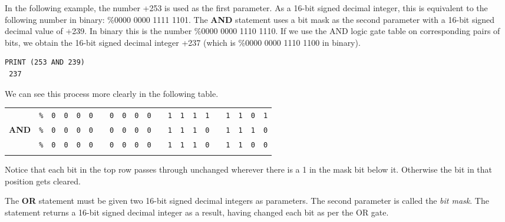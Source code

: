 In the following example, the number +253 is used as the first parameter. As a 16-bit signed decimal integer, this is equivalent to the following number in binary: \%0000 0000 1111 1101. The {\bf AND} statement uses a bit mask as the second parameter with a 16-bit signed decimal value of +239. In binary this is the number \%0000 0000 1110 1110. If we use the AND logic gate table on corresponding pairs of bits, we obtain the 16-bit signed decimal integer +237 (which is \%0000 0000 1110 1100 in binary).
\begin{tcolorbox}[colback=black,coltext=white]
\verbatimfont{\codefont}
\begin{verbatim}
PRINT (253 AND 239)
 237
\end{verbatim}
\end{tcolorbox}

We can see this process more clearly in the following table.

\begin{center}
	\begin{tabular}{ccccccccccccccccccccc}
	  & \texttt{\%} & \texttt{0} & \texttt{0} & \texttt{0} & \texttt{0} & & \texttt{0} & \texttt{0} & \texttt{0} & \texttt{0} & & \texttt{1} & \texttt{1} & \texttt{1} & \texttt{1} & & \texttt{1} & \texttt{1} & \texttt{0} & \texttt{1} \\
	  {\bf AND} & \texttt{\%} & \texttt{0} & \texttt{0} & \texttt{0} & \texttt{0} & & \texttt{0} & \texttt{0} & \texttt{0} & \texttt{0} & & \texttt{1} & \texttt{1} & \texttt{1} & \texttt{0} & & \texttt{1} & \texttt{1} & \texttt{1} & \texttt{0} \\ \hline
	  & \texttt{\%} & \texttt{0} & \texttt{0} & \texttt{0} & \texttt{0} & & \texttt{0} & \texttt{0} & \texttt{0} & \texttt{0} &  & \texttt{1} & \texttt{1} & \texttt{1} & \texttt{0} & & \texttt{1} & \texttt{1} & \texttt{0} & \texttt{0} \\ \hhline{=====================}
	  \end{tabular}
\end{center}

Notice that each bit in the top row passes through unchanged wherever there is a 1 in the mask bit below it. Otherwise the bit in that position gets cleared.

The {\bf OR} statement must be given two 16-bit signed decimal integers as parameters. The second parameter is called the {\it bit mask}. The statement returns a 16-bit signed decimal integer as a result, having changed each bit as per the OR gate.


